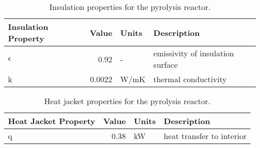 \begin{table}[H]
    \centering
    \caption{Insulation properties for the pyrolysis reactor.}
    \label{tab:insulation}
    \begin{tabular}{lrll}
        \toprule
        Insulation Property & Value & Units & Description \\
        \midrule
        $\epsilon$ & 0.92 & - & emissivity of insulation surface \\
        k & 0.0022 & W/mK & thermal conductivity \\
        \bottomrule
    \end{tabular}
\end{table}

\begin{table}[H]
    \centering
    \caption{Heat jacket properties for the pyrolysis reactor.}
    \label{tab:heatjacket}
    \begin{tabular}{lrll}
        \toprule
        Heat Jacket Property & Value & Units & Description \\
        \midrule
        q & 0.38 & kW & heat transfer to interior \\
        \bottomrule
    \end{tabular}
\end{table}



